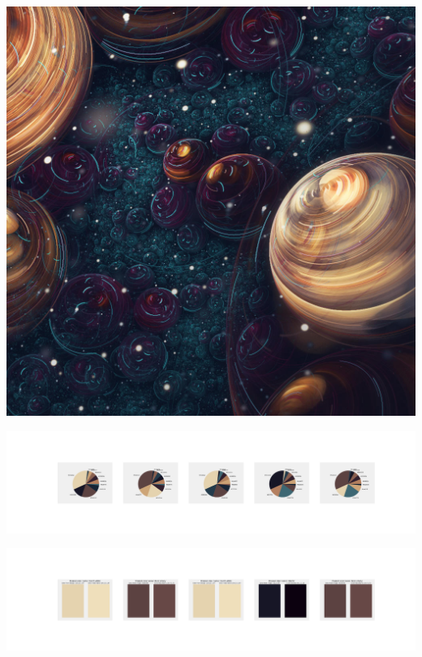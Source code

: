 \documentclass[11pt]{article}
\begin{document}
\begin{landscape}
    \begin{center}
    \includegraphics[width=\textwidth]{./nbimg/file (330).jpg}
    \end{center}

    \begin{center}
    \includegraphics[width=250mm]{./nbimg/pie-257.jpg}
    \end{center}

    \begin{center}
    \includegraphics[width=250mm]{./nbimg/peak-257.jpg}
    \end{center}
    


\end{landscape}
\end{document}
